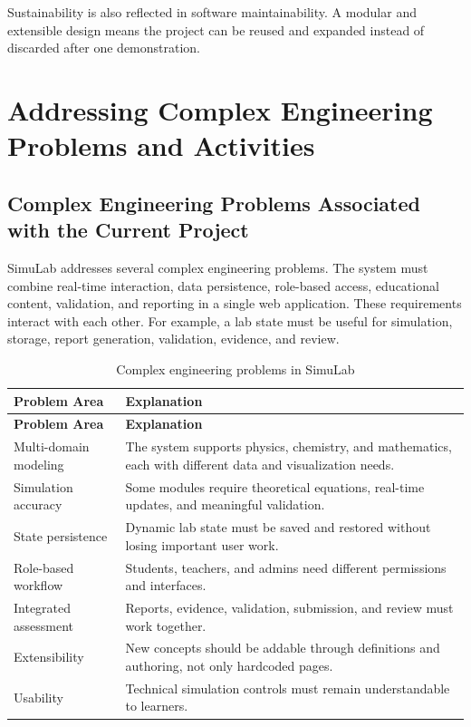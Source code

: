 \documentclass[12pt,a4paper]{report}
\begin{document}
Sustainability is also reflected in software maintainability. A modular and extensible design means the project can be reused and expanded instead of discarded after one demonstration.

\chapter{Addressing Complex Engineering Problems and Activities}

\section{Complex Engineering Problems Associated with the Current Project}
SimuLab addresses several complex engineering problems. The system must combine real-time interaction, data persistence, role-based access, educational content, validation, and reporting in a single web application. These requirements interact with each other. For example, a lab state must be useful for simulation, storage, report generation, validation, evidence, and review.

\begin{longtable}{p{} p{}}
\caption{Complex engineering problems in SimuLab}\\
\toprule
\textbf{Problem Area} & \textbf{Explanation} \\
\midrule
\endfirsthead
\toprule
\textbf{Problem Area} & \textbf{Explanation} \\
\midrule
\endhead
Multi-domain modeling & The system supports physics, chemistry, and mathematics, each with different data and visualization needs. \\
Simulation accuracy & Some modules require theoretical equations, real-time updates, and meaningful validation. \\
State persistence & Dynamic lab state must be saved and restored without losing important user work. \\
Role-based workflow & Students, teachers, and admins need different permissions and interfaces. \\
Integrated assessment & Reports, evidence, validation, submission, and review must work together. \\
Extensibility & New concepts should be addable through definitions and authoring, not only hardcoded pages. \\
Usability & Technical simulation controls must remain understandable to learners. \\
\bottomrule
\end{longtable}
\end{document}

